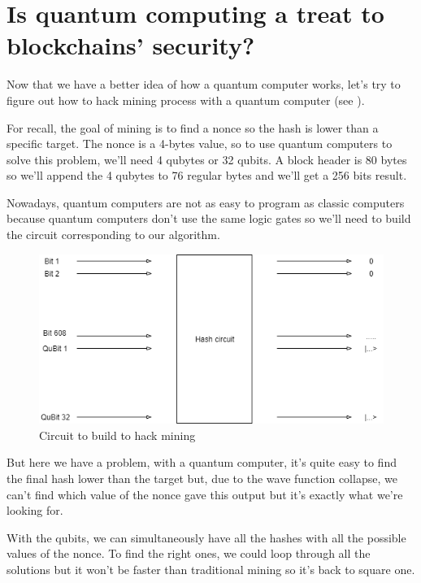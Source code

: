 \section{Is quantum computing a treat to blockchains' security?}

Now that we have a better idea of how a quantum computer works, let's try to figure out how to hack mining process with a quantum computer (see \cite{quantum_computer}). \newline

For recall, the goal of mining is to find a nonce so the hash is lower than a specific target. The nonce is a 4-bytes value, so to use quantum computers to solve this problem, we'll need 4 qubytes or 32 qubits. A block header is 80 bytes so we'll append the 4 qubytes to 76 regular bytes and we'll get a 256 bits result.\newline

Nowadays, quantum computers are not as easy to program as classic computers because quantum computers don't use the same logic gates so we'll need to build the circuit corresponding to our algorithm.

\clearpage

\begin{figure}[ht]
\centering
\includegraphics[width=12cm]{Figures/hashCircuit}
\caption{Circuit to build to hack mining}
\end{figure}
\medskip

But here we have a problem, with a quantum computer, it's quite easy to find the final hash lower than the target but, due to the wave function collapse, we can't find which value of the nonce gave this output but it's exactly what we're looking for. \newline

With the qubits, we can simultaneously have all the hashes with all the possible values of the nonce. To find the right ones, we could loop through all the solutions but it won't be faster than traditional mining so it's back to square one.


